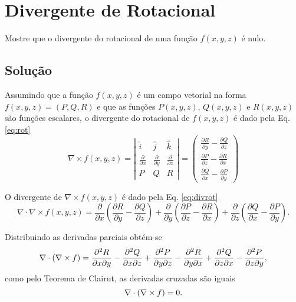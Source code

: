\section{Divergente de Rotacional} \label{sec:ex2}
Mostre que o divergente do rotacional de uma fun\c{c}\~ao ${f}(x,y,z)$ \'e nulo.

\subsection{Solu\c{c}\~ao}
Assumindo que a fun\c{c}\~ao ${f}(x,y,z)$ \'e um campo vetorial na forma ${f}(x,y,z) = (P, Q, R)$ e que as fun\c{c}\~oes $P(x,y,z)$, $Q(x,y,z)$ e $R(x,y,z)$ s\~ao fun\c{c}\~oes escalares, o divergente do rotacional de ${f}(x,y,z)$ \'e dado pela Eq. \eqref{eq:rot}
\begin{equation}
    \label{eq:rot}
    \nabla \times {f}(x,y,z) = \left| \begin{array}{ccc}
        \hat{i} & \hat{j} & \hat{k} \\
        \frac{\partial}{\partial x} & \frac{\partial}{\partial y} & \frac{\partial}{\partial z} \\
        P & Q & R
    \end{array} \right| = 
    \left(\begin{array}{ccc}
         \frac{\partial R}{\partial y} - \frac{\partial Q}{\partial z} \\
        \frac{\partial P}{\partial z} - \frac{\partial R}{\partial x} \\
         \frac{\partial Q}{\partial x} - \frac{\partial P}{\partial y} 
    \end{array}
    \right)
\end{equation}

O divergente de $\nabla \times {f}(x,y,z)$ \'e dado pela Eq. \eqref{eq:divrot}
\begin{equation}
    \label{eq:divrot}
    \nabla \cdot \nabla \times {f}(x,y,z) = \frac{\partial}{\partial x} \left( \frac{\partial R}{\partial y} - \frac{\partial Q}{\partial z} \right) + 
    \frac{\partial}{\partial y} \left( \frac{\partial P}{\partial z} - \frac{\partial R}{\partial x} \right) + 
    \frac{\partial}{\partial z} \left( \frac{\partial Q}{\partial x} - \frac{\partial P}{\partial y} \right).
\end{equation}

Distribuindo as derivadas parciais obt\'em-se
\begin{equation*}
    \nabla \cdot (\nabla \times f) = 
    \frac{\partial^2 R}{\partial x\partial y} - \frac{\partial^2 Q}{\partial x\partial z} + 
    \frac{\partial^2 P}{\partial y\partial z} - \frac{\partial^2 R}{\partial y\partial x}  + 
    \frac{\partial^2 Q}{\partial z\partial x} - \frac{\partial^2 P}{\partial z \partial y},
\end{equation*}
como pelo Teorema de Clairut, as derivadas cruzadas s\~ao iguais
\begin{equation}
    \nabla \cdot (\nabla \times f) = 0.
\end{equation}
